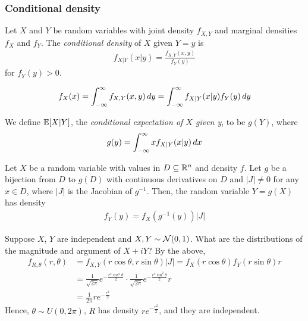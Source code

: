 \documentclass{../../template/note}
\begin{document}
    \subsubsection{Conditional density}

    \begin{definition}
        Let \(X\) and \(Y\) be random variables with joint density \(f_{X, Y}\) and marginal densities \(f_X\) and \(f_Y\). The \emph{conditional density} of \(X\) given \(Y=y\) is
        \begin{align*}
            f_{X | Y}(x | y) = \frac{f_{X, Y}(x, y)}{f_Y(y)}
        \end{align*}
        for \(f_Y(y) > 0\).
    \end{definition}
    
    \begin{proposition}
        \[
            f_X(x) = \int_{-\infty}^\infty f_{X,Y}(x, y) \,d{y} = \int_{-\infty}^\infty f_{X | Y}(x | y)f_Y(y) \,d{y}
        \]
    \end{proposition}
    
    \begin{definition}
        We define \(\mathbb E[X | Y]\), the \emph{conditional expectation of \(X\) given y}, to be \(g(Y)\), where
        \begin{align*}
            g(y) = \int_{-\infty}^\infty x f_{X | Y}(x | y) \,d{x}
        \end{align*}
    \end{definition}
    
    \begin{theorem}
        \label{functions-multivariate}
        Let \(X\) be a random variable with values in \(D \subseteq \mathbb R^n\) and density \(f\). Let \(g\) be a bijection from \(D\) to \(g(D)\) with continuous derivatives on \(D\) and \(|J| \neq 0\) for any \(x \in D\), where \(|J|\) is the Jacobian of \(g^{-1}\). Then, the random variable \(Y = g(X)\) has density
        \begin{align*}
            f_Y(y) = f_X\left(g^{-1}(y)\right) |J|
        \end{align*}  
    \end{theorem}
    
    \begin{example*}
        Suppose \(X\), \(Y\) are independent and \(X, Y \sim \mathcal{N}(0, 1)\). What are the distributions of the magnitude and argument of \(X+iY\)? By the above,
        \begin{align*}
            f_{R, \theta}(r, \theta) &= f_{X, Y}(r \cos \theta, r \sin \theta) |J| = f_X(r \cos \theta)f_Y(r \sin \theta)r \\
            &= \frac 1 {\sqrt{2\pi}} e^{-\frac{r^2\cos^2\theta}2} \cdot \frac 1 {\sqrt{2\pi}} e^{-\frac{r^2\sin^2\theta}2} r \\
            &= \frac 1 {2\pi} re^{-\frac{r^2}2}
        \end{align*}
        Hence, \(\theta \sim U(0, 2\pi)\), \(R\) has density \(re^{-\frac{r^2}2}\), and they are independent.        
    \end{example*}
\end{document}
